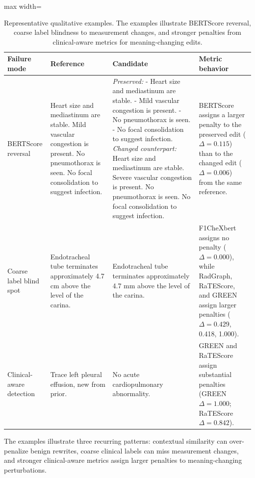 \documentclass[11pt]{article}
\begin{document}
\begin{table}[t]
\centering
\scriptsize
\renewcommand{\arraystretch}{0.92}
\begin{adjustbox}{max width=\textwidth}
\begin{tabular}{p{}p{}p{}p{}}
\toprule
\textbf{Failure mode} & \textbf{Reference} & \textbf{Candidate} & \textbf{Metric behavior} \\
\midrule
BERTScore reversal &
Heart size and mediastinum are stable. Mild vascular congestion is present. No pneumothorax is seen. No focal consolidation to suggest infection. &
\textit{Preserved:} - Heart size and mediastinum are stable. - Mild vascular congestion is present. - No pneumothorax is seen. - No focal consolidation to suggest infection. 
\newline \textit{Changed counterpart:} Heart size and mediastinum are stable. Severe vascular congestion is present. No pneumothorax is seen. No focal consolidation to suggest infection. &
BERTScore assigns a larger penalty to the preserved edit ($\Delta=0.115$) than to the changed edit ($\Delta=0.006$) from the same reference. \\
\midrule
Coarse label blind spot &
Endotracheal tube terminates approximately 4.7 cm above the level of the carina. &
Endotracheal tube terminates approximately 4.7 mm above the level of the carina. &
F1CheXbert assigns no penalty ($\Delta=0.000$), while RadGraph, RaTEScore, and GREEN assign larger penalties ($\Delta=0.429$, 0.418, 1.000). \\
\midrule
Clinical-aware detection &
Trace left pleural effusion, new from prior. &
No acute cardiopulmonary abnormality. &
GREEN and RaTEScore assign substantial penalties (GREEN $\Delta=1.000$; RaTEScore $\Delta=0.842$). \\
\bottomrule
\end{tabular}
\end{adjustbox}
\caption{Representative qualitative examples. The examples illustrate BERTScore reversal, coarse label blindness to measurement changes, and stronger penalties from clinical-aware metrics for meaning-changing edits.}
\label{tab:qualitative}
\end{table}

The examples illustrate three recurring patterns: contextual similarity can over-penalize benign rewrites, coarse clinical labels can miss measurement changes, and stronger clinical-aware metrics assign larger penalties to meaning-changing perturbations.
\end{document}
